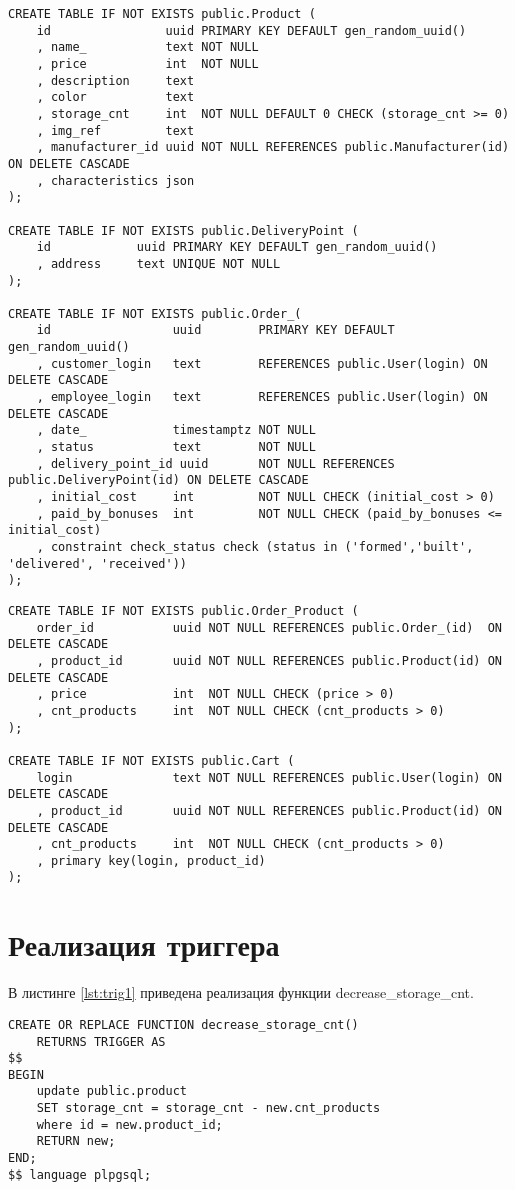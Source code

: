 \begin{lstlisting}[label=lst:er2,caption=Запросы для создания таблиц (часть 2)]
CREATE TABLE IF NOT EXISTS public.Product (
	id 	              uuid PRIMARY KEY DEFAULT gen_random_uuid()
	, name_           text NOT NULL
	, price           int  NOT NULL
	, description     text
	, color           text
	, storage_cnt     int  NOT NULL DEFAULT 0 CHECK (storage_cnt >= 0)
	, img_ref         text
	, manufacturer_id uuid NOT NULL REFERENCES public.Manufacturer(id) ON DELETE CASCADE
	, characteristics json
);

CREATE TABLE IF NOT EXISTS public.DeliveryPoint (
	id            uuid PRIMARY KEY DEFAULT gen_random_uuid()
	, address 	  text UNIQUE NOT NULL
);

CREATE TABLE IF NOT EXISTS public.Order_(
	id                 uuid        PRIMARY KEY DEFAULT gen_random_uuid()
	, customer_login   text        REFERENCES public.User(login) ON DELETE CASCADE
	, employee_login   text        REFERENCES public.User(login) ON DELETE CASCADE
	, date_            timestamptz NOT NULL
	, status           text        NOT NULL
	, delivery_point_id uuid       NOT NULL REFERENCES public.DeliveryPoint(id) ON DELETE CASCADE
	, initial_cost     int         NOT NULL CHECK (initial_cost > 0)
	, paid_by_bonuses  int         NOT NULL CHECK (paid_by_bonuses <= initial_cost)
	, constraint check_status check (status in ('formed','built', 'delivered', 'received'))
);
\end{lstlisting}

\clearpage
\begin{lstlisting}[label=lst:er3,caption=Запросы для создания таблиц (часть 3)]
CREATE TABLE IF NOT EXISTS public.Order_Product (
	order_id           uuid NOT NULL REFERENCES public.Order_(id)  ON DELETE CASCADE
	, product_id       uuid NOT NULL REFERENCES public.Product(id) ON DELETE CASCADE
	, price      	   int  NOT NULL CHECK (price > 0)
	, cnt_products 	   int  NOT NULL CHECK (cnt_products > 0)
);

CREATE TABLE IF NOT EXISTS public.Cart (
	login              text NOT NULL REFERENCES public.User(login) ON DELETE CASCADE
	, product_id       uuid NOT NULL REFERENCES public.Product(id) ON DELETE CASCADE
	, cnt_products 	   int  NOT NULL CHECK (cnt_products > 0)
	, primary key(login, product_id)
);
\end{lstlisting}

\section{Реализация триггера}
В листинге \ref{lst:trig1} приведена реализация функции decrease\_storage\_cnt.
\begin{lstlisting}[label=lst:trig1,caption=Реализация функции decrease\_storage\_cnt]
CREATE OR REPLACE FUNCTION decrease_storage_cnt()
	RETURNS TRIGGER AS
$$
BEGIN
	update public.product
	SET storage_cnt = storage_cnt - new.cnt_products
	where id = new.product_id;
	RETURN new;
END;
$$ language plpgsql;
\end{lstlisting}

